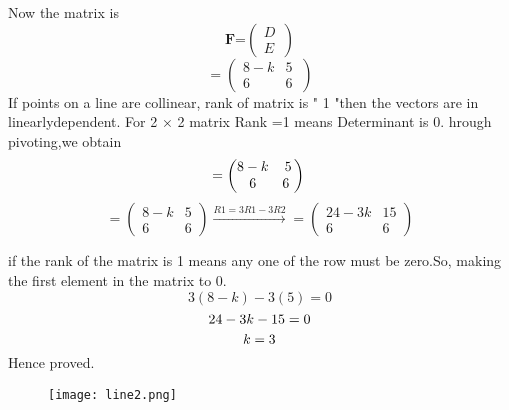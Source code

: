 \documentclass[10pt, a4paper]{article}
\begin{document}
\boldmath
Now the matrix is\\
\begin{equation}\label{eq:}
\textbf{F=$\begin{pmatrix} D\\ E\ \end{pmatrix}$}
\end{equation}
\unboldmath
\begin{equation} \label{eq:}
=\begin{pmatrix} 8-k & 5\\ 6 & 6 \ \end{pmatrix} 
\end{equation}
If  points on a line  are  collinear, rank of matrix is " 1 "then the vectors are in linearlydependent.
For 2 × 2 matrix Rank =1 means Determinant is 0.
hrough pivoting,we obtain
\begin{equation}\label{eq:}
=\begin{pmatrix} 8-k & 5\\ 6 & 6 \ \end{pmatrix} \\ 
\end{equation}
\begin{equation}\label{eq:}
=\begin{pmatrix}
8-k & 5 \\ 
 6& 6
\end{pmatrix}\overset{R1=3R1-3R2}{\rightarrow}
=\begin{pmatrix}
24-3k &15 \\ 
 6& 6
\end{pmatrix}
\end{equation}

if the rank of the matrix is 1 means any one of the row must be zero.So, making the first element in the matrix to 0.
\begin{equation}\label{eq:}
3(8-k)-3(5)=0
\end{equation} 
\begin{equation}\label{eq:}
24-3k-15=0\\
\end{equation} 
\begin{equation}\label{eq:}
k=3 \\
\end{equation} 
Hence proved.
\begin{figure}[h!]
	  \centering 
	  \texttt{[image: line2.png]}
	  \caption{}
	  \label{fig:line2.png}
	  \end{figure}
\end{document}

